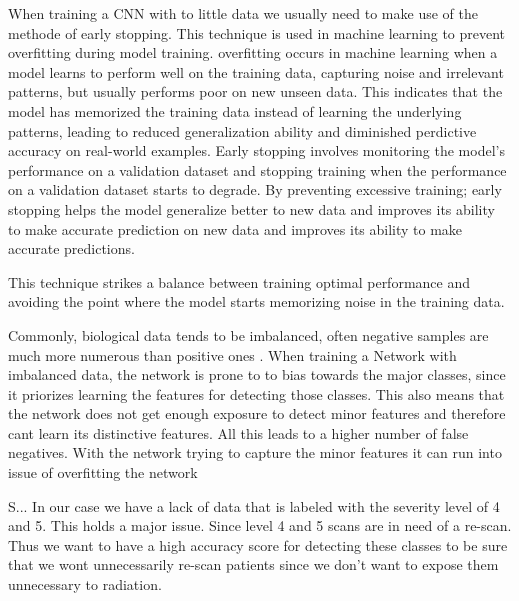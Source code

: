 \documentclass[
a4paper, 
12pt,
grayscalebody, %
abstract=on,
twoside, BCOR10mm, 12pt, DIV13,headinclude, footexclude, final, abstracton, openright
]{ibireprt}
\numberwithin{equation}{chapter}
\numberwithin{table}{chapter}
\numberwithin{figure}{chapter}
\numberwithin{algorithm}{chapter}
\numberwithin{example}{chapter}
\numberwithin{example}{chapter}
\begin{document}
 When training a CNN with to little data we usually need to make use of the methode of early stopping. This technique is used in machine learning to prevent overfitting during model training. overfitting occurs in machine learning when a model learns to perform well on the training data, capturing noise and irrelevant patterns, but usually performs poor on new unseen data. This indicates that the model has memorized the training data instead of learning the underlying patterns, leading to reduced generalization ability and diminished perdictive accuracy on real-world examples. Early stopping involves monitoring the model's performance on a validation dataset and stopping training when the performance on a validation dataset starts to degrade. By preventing excessive training; early stopping helps the model generalize better to new data and improves its ability to make accurate prediction on new data and improves its ability to make accurate predictions.
 
 
  This technique strikes a balance between training optimal performance and avoiding the point where the model starts memorizing noise in the training data. %
 
 Commonly, biological data tends to be imbalanced, often negative samples are much more numerous than positive ones \cite{Alzubaidi2021}. When training a Network with imbalanced data, the network is prone to to bias towards the major classes, since it priorizes learning the features for detecting those classes. This also means that the network does not get enough exposure to detect minor features and therefore cant learn its distinctive features. All this leads to a higher number of false negatives. With the network trying to capture the minor features it can run into issue of overfitting the network %
 
  S... In our case we have a lack of data that is labeled with the severity level of 4 and 5. This holds a major issue. Since level 4 and 5 scans are in need of a re-scan. Thus we want to have a high accuracy score for detecting these classes to be sure that we wont unnecessarily re-scan patients since we don't want to expose them unnecessary to radiation.
 
\end{document}
